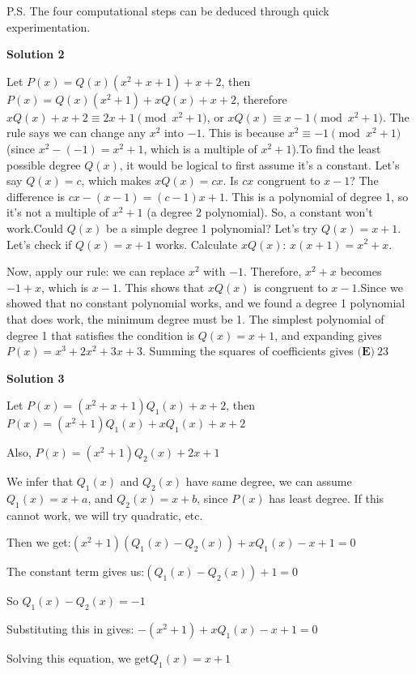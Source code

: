 \begin{enumerate}
 P.S. The four computational steps can be deduced through quick experimentation.

 



\textbf{Solution 2}

Let $P(x) = Q(x)(x^2+x+1) + x + 2$, then $P(x) = Q(x)(x^2+1) + xQ(x) + x + 2$, therefore $xQ(x) + x + 2 \equiv 2x + 1 \pmod{x^2+1}$, or $xQ(x) \equiv x-1 \pmod{x^2+1}$. The rule says we can change any $x^2$ into $-1$. This is because $x^2 \equiv -1 \pmod{x^2+1}$ (since $x^2 - (-1) = x^2+1$, which is a multiple of $x^2+1$).To find the least possible degree $Q(x)$, it would be logical to first assume it's a constant. Let's say $Q(x)=c$, which makes $xQ(x) = cx$. Is $cx$ congruent to $x-1$? The difference is $cx - (x-1) = (c-1)x+1$. This is a polynomial of degree 1, so it's not a multiple of $x^2+1$ (a degree 2 polynomial). So, a constant won't work.Could $Q(x)$ be a simple degree 1 polynomial? Let's try $Q(x) = x+1$. Let's check if $Q(x) = x+1$ works. Calculate $xQ(x)$: $x(x+1) = x^2+x$. 

 Now, apply our rule: we can replace $x^2$ with $-1$. Therefore, $x^2+x$ becomes $-1+x$, which is $x-1$. This shows that $xQ(x)$ is congruent to $x-1$.Since we showed that no constant polynomial works, and we found a degree 1 polynomial that does work, the minimum degree must be 1. The simplest polynomial of degree 1 that satisfies the condition is $Q(x)=x+1$, and expanding gives $P(x) = x^3+2x^2+3x+3$. Summing the squares of coefficients gives $\boxed{\textbf{(E)} \ 23}$




\textbf{Solution 3}

Let $P(x) = (x^2+x+1)Q_1(x) + x + 2$, then $P(x) = (x^2+1)Q_1(x) + xQ_1(x) + x + 2$

 Also, $P(x) = (x^2+1)Q_2(x) + 2x + 1$

 We infer that $Q_1(x)$ and $Q_2(x)$ have same degree, we can assume $Q_1(x) = x + a$, and $Q_2(x) = x + b$, since $P(x)$ has least degree. If this cannot work, we will try quadratic, etc.

 Then we get:$(x^2+1)(Q_1(x) - Q_2(x)) + xQ_1(x) - x + 1 = 0$

 The constant term gives us:$(Q_1(x) - Q_2(x)) + 1 = 0$

 So $Q_1(x) - Q_2(x) = -1$

 Substituting this in gives: $-(x^2+1) + xQ_1(x) - x + 1 = 0$

 Solving this equation, we get$Q_1(x) = x + 1$ 


\end{enumerate}

